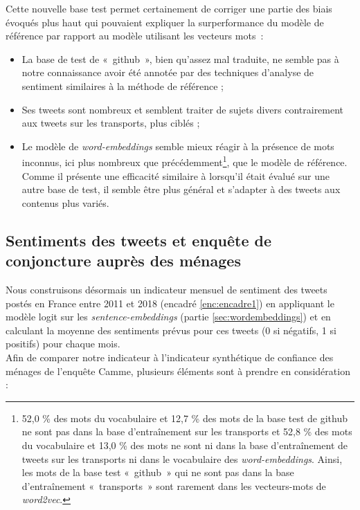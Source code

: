 \documentclass[11pt,french,french]{article}
\let\rmarkdownfootnote\footnote%
\def\footnote{\protect\rmarkdownfootnote}
\begin{document}
Cette nouvelle base test permet certainement de corriger une partie des
biais évoqués plus haut qui pouvaient expliquer la surperformance du
modèle de référence par rapport au modèle utilisant les vecteurs mots~:

\begin{itemize}
\item
  La base de test de «~github~», bien qu'assez mal traduite, ne semble
  pas à notre connaissance avoir été annotée par des techniques
  d'analyse de sentiment similaires à la méthode de référence ;
\item
  Ses tweets sont nombreux et semblent traiter de sujets divers
  contrairement aux tweets sur les transports, plus ciblés ;
\item
  Le modèle de \emph{word-embeddings} semble mieux réagir à la présence
  de mots inconnus, ici plus nombreux que précédemment\footnote{52,0 \%
    des mots du vocabulaire et 12,7 \% des mots de la base test de
    github ne sont pas dans la base d'entraînement sur les transports et
    52,8 \% des mots du vocabulaire et 13,0 \% des mots ne sont ni dans
    la base d'entraînement de tweets sur les transports ni dans le
    vocabulaire des \emph{word-embeddings}. Ainsi, les mots de la base
    test «~github~» qui ne sont pas dans la base d'entraînement
    «~transports~» sont rarement dans les vecteurs-mots de
    \emph{word2vec}.}, que le modèle de référence. Comme il présente une
  efficacité similaire à lorsqu'il était évalué sur une autre base de
  test, il semble être plus général et s'adapter à des tweets aux
  contenus plus variés.
\end{itemize}

\subsection{Sentiments des tweets et enquête de conjoncture auprès des
ménages}\label{sentiments-des-tweets-et-enquuxeate-de-conjoncture-aupruxe8s-des-muxe9nages}

Nous construisons désormais un indicateur mensuel de sentiment des
tweets postés en France entre 2011 et 2018 (encadré \ref{enc:encadre1})
en appliquant le modèle logit sur les \emph{sentence-embeddings} (partie
\ref{sec:wordembeddings}) et en calculant la moyenne des sentiments
prévus pour ces tweets (0 si négatifs, 1 si positifs) pour chaque
mois.\\
Afin de comparer notre indicateur à l'indicateur synthétique de
confiance des ménages de l'enquête Camme, plusieurs éléments sont à
prendre en considération :
\end{document}
